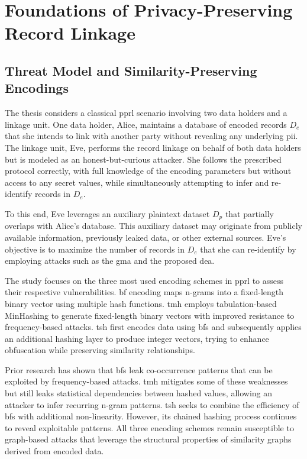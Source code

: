 \documentclass[a4paper,11pt]{scrartcl}
\begin{document}
\section{Foundations of Privacy-Preserving Record Linkage}

\subsection{Threat Model and Similarity-Preserving Encodings}
The thesis considers a classical \ac{pprl} scenario involving two data holders and a linkage unit. 
One data holder, Alice, maintains a database of encoded records $D_e$ that she intends to link with another party without revealing any underlying \ac{pii}. 
The linkage unit, Eve, performs the record linkage on behalf of both data holders but is modeled as an honest-but-curious attacker.
She follows the prescribed protocol correctly, with full knowledge of the encoding parameters but without access to any secret values, while simultaneously attempting to infer and re-identify records in $D_e$.

To this end, Eve leverages an auxiliary plaintext dataset $D_p$ that partially overlaps with Alice’s database. 
This auxiliary dataset may originate from publicly available information, previously leaked data, or other external sources. 
Eve’s objective is to maximize the number of records in $D_e$ that she can re-identify by employing attacks such as the \ac{gma} and the proposed \ac{dea}.

The study focuses on the three most used encoding schemes in \ac{pprl} to assess their respective vulnerabilities. 
\ac{bf} encoding maps n-grams into a fixed-length binary vector using multiple hash functions. 
\ac{tmh} employs tabulation-based MinHashing to generate fixed-length binary vectors with improved resistance to frequency-based attacks. 
\ac{tsh} first encodes data using \ac{bf}s and subsequently applies an additional hashing layer to produce integer vectors, trying to enhance obfuscation while preserving similarity relationships.

Prior research has shown that \ac{bf}s leak co-occurrence patterns that can be exploited by frequency-based attacks. 
\ac{tmh} mitigates some of these weaknesses but still leaks statistical dependencies between hashed values, allowing an attacker to infer recurring n-gram patterns.
\ac{tsh} seeks to combine the efficiency of \ac{bf}s with additional non-linearity.
However, its chained hashing process continues to reveal exploitable patterns. 
All three encoding schemes remain susceptible to graph-based attacks that leverage the structural properties of similarity graphs derived from encoded data.
\end{document}
